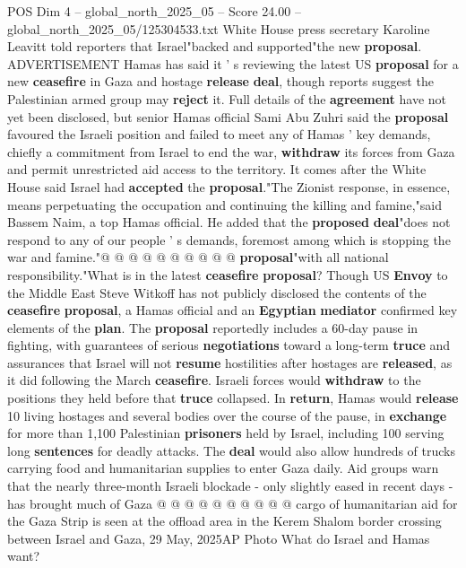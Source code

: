\begin{textsample}{POS Dim 4 – global\_north\_2025\_05 – Score 24.00 – global\_north\_2025\_05/125304533.txt}  \label{ex:f4_pos_199}
White House press secretary Karoline Leavitt told reporters that Israel"backed and supported"the new \textbf{proposal}.
ADVERTISEMENT Hamas has said it ' s reviewing the latest US \textbf{proposal} for a new \textbf{ceasefire} in Gaza and hostage \textbf{release} \textbf{deal}, though reports suggest the Palestinian armed group may \textbf{reject} it.
Full details of the \textbf{agreement} have not yet been disclosed, but senior Hamas official Sami Abu Zuhri said the \textbf{proposal} favoured the Israeli position and failed to meet any of Hamas ' key demands, chiefly a commitment from Israel to end the war, \textbf{withdraw} its forces from Gaza and permit unrestricted aid access to the territory.
It comes after the White House said Israel had \textbf{accepted} the \textbf{proposal}."The Zionist response, in essence, means perpetuating the occupation and continuing the killing and famine,"said Bassem Naim, a top Hamas official.
He added that the \textbf{proposed} \textbf{deal}"does not respond to any of our people ' s demands, foremost among which is stopping the war and famine."@ @ @ @ @ @ @ @ @ @ \textbf{proposal}"with all national responsibility."What is in the latest \textbf{ceasefire} \textbf{proposal}?
Though US \textbf{Envoy} to the Middle East Steve Witkoff has not publicly disclosed the contents of the \textbf{ceasefire} \textbf{proposal}, a Hamas official and an \textbf{Egyptian} \textbf{mediator} confirmed key elements of the \textbf{plan}.
The \textbf{proposal} reportedly includes a 60-day pause in fighting, with guarantees of serious \textbf{negotiations} toward a long-term \textbf{truce} and assurances that Israel will not \textbf{resume} hostilities after hostages are \textbf{released}, as it did following the March \textbf{ceasefire}.
Israeli forces would \textbf{withdraw} to the positions they held before that \textbf{truce} collapsed.
In \textbf{return}, Hamas would \textbf{release} 10 living hostages and several bodies over the course of the pause, in \textbf{exchange} for more than 1,100 Palestinian \textbf{prisoners} held by Israel, including 100 serving long \textbf{sentences} for deadly attacks.
The \textbf{deal} would also allow hundreds of trucks carrying food and humanitarian supplies to enter Gaza daily.
Aid groups warn that the nearly three-month Israeli blockade - only slightly eased in recent days - has brought much of Gaza @ @ @ @ @ @ @ @ @ @ cargo of humanitarian aid for the Gaza Strip is seen at the offload area in the Kerem Shalom border crossing between Israel and Gaza, 29 May, 2025AP Photo What do Israel and Hamas want?

\end{textsample}
